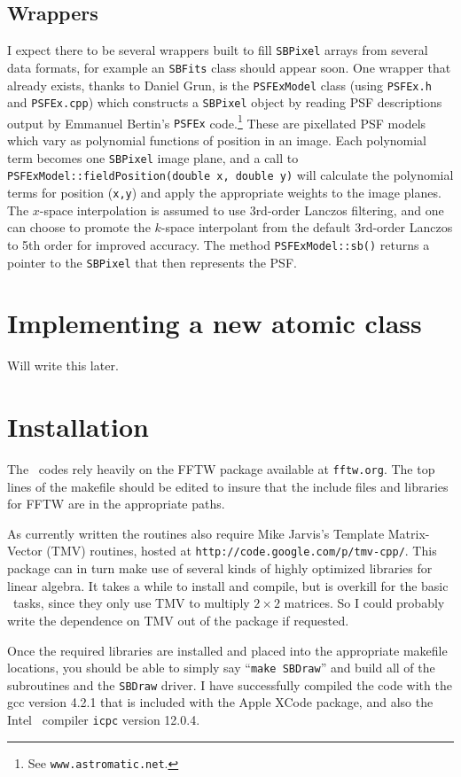 \documentclass[11pt,preprint,flushrt]{aastex}
\begin{document}
\subsection{Wrappers}
I expect there to be several wrappers built to fill {\tt SBPixel} arrays from several data formats, for example an {\tt SBFits} class should appear soon.  One wrapper that already exists, thanks to Daniel Grun, is the {\tt PSFExModel} class (using {\tt PSFEx.h} and {\tt PSFEx.cpp}) which constructs a {\tt SBPixel} object by reading PSF descriptions output by Emmanuel Bertin's {\tt PSFEx} code.\footnote{See {\tt www.astromatic.net}.}  These are pixellated PSF models which vary as polynomial functions of position in an image.  Each polynomial term becomes one {\tt SBPixel} image plane, and a call to {\tt PSFExModel::fieldPosition(double x, double y)} will calculate the polynomial terms for position ({\tt x,y}) and apply the appropriate weights to the image planes.  The $x$-space interpolation is assumed to use 3rd-order Lanczos filtering, and one can choose to promote the $k$-space interpolant from the default 3rd-order Lanczos to 5th order for improved accuracy.  The method {\tt PSFExModel::sb()} returns a pointer to the {\tt SBPixel} that then represents the PSF.

\section{Implementing a new atomic class}
Will write this later.

\section{Installation}
The \sbp\ codes rely heavily on the FFTW package available at {\tt fftw.org}.  The top lines of the makefile should be edited to insure that the include files and libraries for FFTW are in the appropriate paths.

As currently written the routines also require Mike Jarvis's Template Matrix-Vector (TMV) routines, hosted at {\tt http://code.google.com/p/tmv-cpp/}.  This package can in turn make use of several kinds of highly optimized libraries for linear algebra.  It takes a while to install and compile, but is overkill for the basic \sbp\ tasks, since they only use TMV to multiply $2\times2$ matrices.  So I could probably write the dependence on TMV out of the package if requested.

Once the required libraries are installed and placed into the appropriate makefile locations, you should be able to simply say ``{\tt make SBDraw}''  and build all of the subroutines and the {\tt SBDraw} driver.  I have successfully compiled the code with the gcc version 4.2.1 that is included with the Apple XCode package, and also the Intel \cpp\ compiler {\tt icpc} version 12.0.4.
\end{document}
